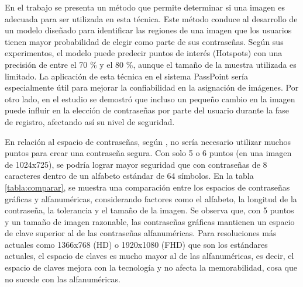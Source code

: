 \documentclass[12pt]{report}
\begin{document}
	
	En el trabajo \cite{18} se presenta un método que permite determinar si una imagen es adecuada para ser utilizada en esta técnica. Este método conduce al desarrollo de un modelo diseñado para identificar las regiones de una imagen que los usuarios tienen mayor probabilidad de elegir como parte de sus contraseñas. Según sus experimentos, el modelo puede predecir puntos de interés (Hotspots) con una precisión de entre el 70 \% y el 80 \%, aunque el tamaño de la muestra utilizada es limitado. La aplicación de esta técnica en el sistema PassPoint sería especialmente útil para mejorar la confiabilidad en la asignación de imágenes. Por otro lado, en el estudio \cite{19} se demostró que incluso un pequeño cambio en la imagen puede influir en la elección de contraseñas por parte del usuario durante la fase de registro, afectando así su nivel de seguridad.    

	
	En relación al espacio de contraseñas, según \cite{1}, no sería necesario utilizar muchos puntos para crear una contraseña segura. Con solo 5 o 6 puntos (en una imagen de 1024x725), se podría lograr mayor seguridad que con contraseñas de 8 caracteres dentro de un alfabeto estándar de 64 símbolos. En la tabla \ref{tabla:comparar}, se muestra una comparación entre los espacios de contraseñas gráficas y alfanuméricas, considerando factores como el alfabeto, la longitud de la contraseña, la tolerancia y el tamaño de la imagen. Se observa que, con 5 puntos y un tamaño de imagen razonable, las contraseñas gráficas mantienen un espacio de clave superior al de las contraseñas alfanuméricas. Para resoluciones más actuales como 1366x768 (HD) o 1920x1080 (FHD) que son los estándares actuales, el espacio de claves  es mucho mayor al de las alfanuméricas, es decir, el espacio de claves mejora con la tecnología y no afecta la memorabilidad, cosa que no sucede con las alfanuméricas.
	
\end{document}
